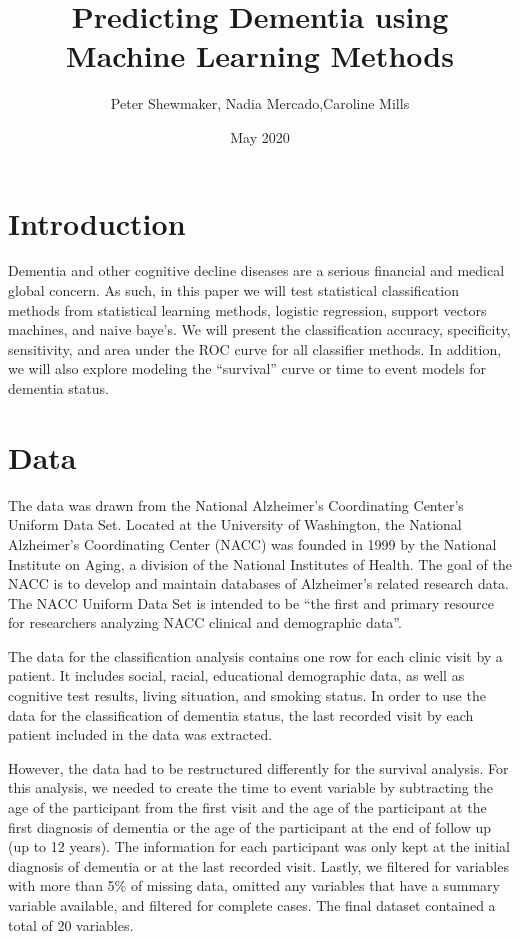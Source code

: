\documentclass[a4paper,man,natbib,11pt]{article}
\title{Predicting Dementia using Machine Learning Methods}
\author{Peter Shewmaker, Nadia Mercado,Caroline Mills  }
\date{May 2020}
\begin{document}
\maketitle

\section{Introduction}

Dementia and other cognitive decline diseases are a serious financial and medical global concern. As such, in this paper we will test statistical classification methods from statistical learning methods, logistic regression, support vectors machines, and naive baye's. We will present the classification accuracy, specificity, sensitivity, and area under the ROC curve for all classifier methods. In addition, we will also explore modeling the ``survival'' curve or time to event models for dementia status. 

\section{Data}

The data was drawn from the National Alzheimer's Coordinating Center's Uniform Data Set. Located at the University of Washington, the National Alzheimer's Coordinating Center (NACC) was founded in 1999 by the National Institute on Aging, a division of the National Institutes of Health. The goal of the NACC is to develop and maintain databases of Alzheimer's related research data. The NACC Uniform Data Set is intended to be ``the first and primary resource for researchers analyzing NACC clinical and demographic data''.

The data for the classification analysis contains one row for each clinic visit by a patient. It includes social, racial, educational demographic data, as well as cognitive test results, living situation, and smoking status. In order to use the data for the classification of dementia status, the last recorded visit by each patient included in the data was extracted.

However, the data had to be restructured differently for the survival analysis. For this analysis, we needed to create the time to event variable by subtracting the age of the participant from the first visit and the age of the participant at the first diagnosis of dementia or the age of the participant at the end of follow up (up to 12 years). The information for each participant was only kept at the initial diagnosis of dementia or at the last recorded visit. Lastly, we filtered for variables with more than 5\% of missing data, omitted any variables that have a summary variable available, and filtered for complete cases. The final dataset contained a total of 20 variables.
\end{document}
